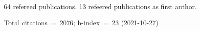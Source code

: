 64 refereed publications. 13 refeered publications as first author.

Total citations~=~2076; h-index~=~23 (2021-10-27)